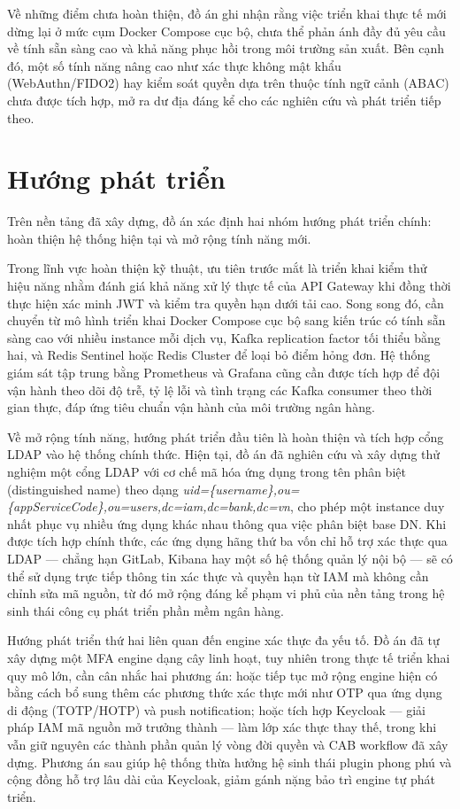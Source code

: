 \documentclass[../DoAn.tex]{subfiles}
\begin{document}
Về những điểm chưa hoàn thiện, đồ án ghi nhận rằng việc triển khai thực tế mới dừng lại ở mức cụm Docker Compose cục bộ, chưa thể phản ánh đầy đủ yêu cầu về tính sẵn sàng cao và khả năng phục hồi trong môi trường sản xuất. Bên cạnh đó, một số tính năng nâng cao như xác thực không mật khẩu (WebAuthn/FIDO2) hay kiểm soát quyền dựa trên thuộc tính ngữ cảnh (ABAC) chưa được tích hợp, mở ra dư địa đáng kể cho các nghiên cứu và phát triển tiếp theo.

\section{Hướng phát triển}

Trên nền tảng đã xây dựng, đồ án xác định hai nhóm hướng phát triển chính: hoàn thiện hệ thống hiện tại và mở rộng tính năng mới.

Trong lĩnh vực hoàn thiện kỹ thuật, ưu tiên trước mắt là triển khai kiểm thử hiệu năng nhằm đánh giá khả năng xử lý thực tế của API Gateway khi đồng thời thực hiện xác minh JWT và kiểm tra quyền hạn dưới tải cao. Song song đó, cần chuyển từ mô hình triển khai Docker Compose cục bộ sang kiến trúc có tính sẵn sàng cao với nhiều instance mỗi dịch vụ, Kafka replication factor tối thiểu bằng hai, và Redis Sentinel hoặc Redis Cluster để loại bỏ điểm hỏng đơn. Hệ thống giám sát tập trung bằng Prometheus và Grafana cũng cần được tích hợp để đội vận hành theo dõi độ trễ, tỷ lệ lỗi và tình trạng các Kafka consumer theo thời gian thực, đáp ứng tiêu chuẩn vận hành của môi trường ngân hàng.

Về mở rộng tính năng, hướng phát triển đầu tiên là hoàn thiện và tích hợp cổng LDAP vào hệ thống chính thức. Hiện tại, đồ án đã nghiên cứu và xây dựng thử nghiệm một cổng LDAP với cơ chế mã hóa ứng dụng trong tên phân biệt (distinguished name) theo dạng \textit{uid=\{username\},ou=\{appServiceCode\},ou=users,dc=iam,dc=bank,dc=vn}, cho phép một instance duy nhất phục vụ nhiều ứng dụng khác nhau thông qua việc phân biệt base DN. Khi được tích hợp chính thức, các ứng dụng hãng thứ ba vốn chỉ hỗ trợ xác thực qua LDAP --- chẳng hạn GitLab, Kibana hay một số hệ thống quản lý nội bộ --- sẽ có thể sử dụng trực tiếp thông tin xác thực và quyền hạn từ IAM mà không cần chỉnh sửa mã nguồn, từ đó mở rộng đáng kể phạm vi phủ của nền tảng trong hệ sinh thái công cụ phát triển phần mềm ngân hàng.

Hướng phát triển thứ hai liên quan đến engine xác thực đa yếu tố. Đồ án đã tự xây dựng một MFA engine dạng cây linh hoạt, tuy nhiên trong thực tế triển khai quy mô lớn, cần cân nhắc hai phương án: hoặc tiếp tục mở rộng engine hiện có bằng cách bổ sung thêm các phương thức xác thực mới như OTP qua ứng dụng di động (TOTP/HOTP) và push notification; hoặc tích hợp Keycloak --- giải pháp IAM mã nguồn mở trưởng thành --- làm lớp xác thực thay thế, trong khi vẫn giữ nguyên các thành phần quản lý vòng đời quyền và CAB workflow đã xây dựng. Phương án sau giúp hệ thống thừa hưởng hệ sinh thái plugin phong phú và cộng đồng hỗ trợ lâu dài của Keycloak, giảm gánh nặng bảo trì engine tự phát triển.
\end{document}
